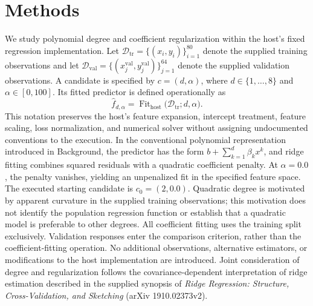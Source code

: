 \documentclass[11pt]{article}
\begin{document}
\section{Methods}
We study polynomial degree and coefficient regularization within the host's fixed regression implementation. Let \(\mathcal{D}_{\mathrm{tr}}=\{(x_i,y_i)\}_{i=1}^{80}\) denote the supplied training observations and let \(\mathcal{D}_{\mathrm{val}}=\{(x_j^{\mathrm{val}},y_j^{\mathrm{val}})\}_{j=1}^{64}\) denote the supplied validation observations. A candidate is specified by \(c=(d,\alpha)\), where \(d\in\{1,\ldots,8\}\) and \(\alpha\in[0,100]\). Its fitted predictor is defined operationally as
\[
\widehat f_{d,\alpha}
=
\operatorname{Fit}_{\mathrm{host}}
\bigl(\mathcal{D}_{\mathrm{tr}};d,\alpha\bigr).
\]
This notation preserves the host's feature expansion, intercept treatment, feature scaling, loss normalization, and numerical solver without assigning undocumented conventions to the execution. In the conventional polynomial representation introduced in Background, the predictor has the form \(b+\sum_{k=1}^{d}\beta_k x^k\), and ridge fitting combines squared residuals with a quadratic coefficient penalty. At \(\alpha=0.0\), the penalty vanishes, yielding an unpenalized fit in the specified feature space. The executed starting candidate is \(c_0=(2,0.0)\). Quadratic degree is motivated by apparent curvature in the supplied training observations; this motivation does not identify the population regression function or establish that a quadratic model is preferable to other degrees. All coefficient fitting uses the training split exclusively. Validation responses enter the comparison criterion, rather than the coefficient-fitting operation. No additional observations, alternative estimators, or modifications to the host implementation are introduced. Joint consideration of degree and regularization follows the covariance-dependent interpretation of ridge estimation described in the supplied synopsis of \textit{Ridge Regression: Structure, Cross-Validation, and Sketching} (arXiv 1910.02373v2).
\end{document}
